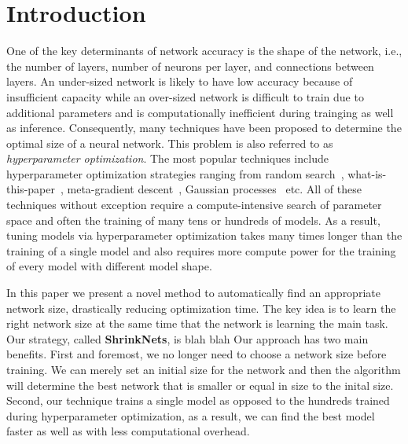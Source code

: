 \section{Introduction}

One of the key determinants of network accuracy is the shape of the network, 
i.e., the number of layers, number of neurons per layer, and connections between
layers.
An under-sized network is likely to have low accuracy because of insufficient 
capacity while an over-sized network is difficult to train due to additional 
parameters and is computationally inefficient during trainging as well as
inference.
Consequently, many techniques have been proposed to determine the optimal size of
a neural network.
This problem is also referred to as {\it hyperparameter optimization}.
The most popular techniques include hyperparameter optimization strategies 
ranging from random search~\cite{paper-on-random-is-good-enough}, 
what-is-this-paper~\cite{Bengio2012a}, 
meta-gradient descent~\cite{Pedregosa2016},
Gaussian processes~\cite{Bergstra2011a} etc.
All of these techniques without exception require a compute-intensive search of 
parameter space and often the training of many tens or hundreds of models.
As a result, tuning models via hyperparameter optimization takes many times 
longer than the training of a single model and also requires more compute power
for the training of every model with different model shape.

In this paper we present a novel method to automatically find an appropriate
network size, drastically reducing optimization time. 
The key idea is to learn the right network size at the same time that
the network is learning the main task.
Our strategy, called \textbf{ShrinkNets}, is blah blah 
Our approach has two main benefits. 
First and foremost, we no longer need to choose a network size before training.
We can merely set an initial size for the network and then the algorithm will
determine the best network that is smaller or equal in size to the inital size.
Second, our technique trains a single model as opposed to the hundreds trained
during hyperparameter optimization, as a result, we can find the best model 
faster as well as with less computational overhead.


